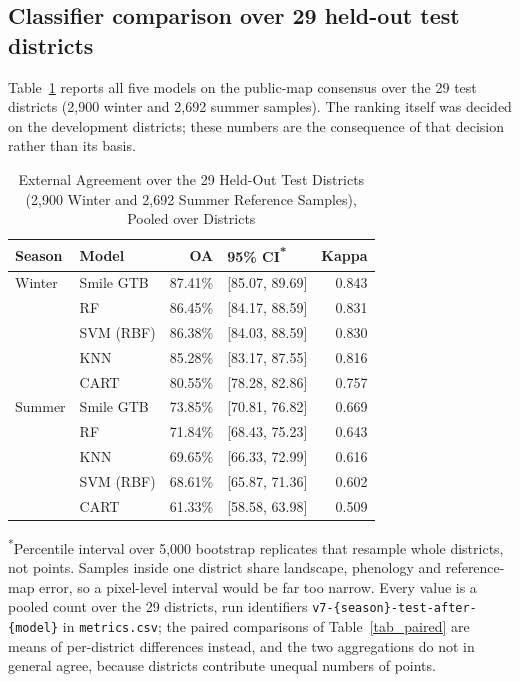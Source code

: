 \documentclass[conference]{IEEEtran}
\begin{document}
\subsection{Classifier comparison over 29 held-out test districts}
\label{sec:models}
Table~\ref{tab:statewide_accuracy} reports all five models on the public-map consensus over the 29 test districts (2,900 winter and 2,692 summer samples). The ranking itself was decided on the development districts; these numbers are the consequence of that decision rather than its basis.

\begin{table}[!htbp]
\caption{External Agreement over the 29 Held-Out Test Districts (2,900 Winter and 2,692 Summer Reference Samples), Pooled over Districts}
\label{tab:statewide_accuracy}
\centering
\setlength{\tabcolsep}{3.5pt}
\begin{tabular}{llrlr}
\toprule
\textbf{Season} & \textbf{Model} & \textbf{OA} & \textbf{95\% CI\textsuperscript{*}} & \textbf{Kappa} \\
\midrule
Winter & Smile GTB & 87.41\% & [85.07, 89.69] & 0.843 \\
       & RF        & 86.45\% & [84.17, 88.59] & 0.831 \\
       & SVM (RBF) & 86.38\% & [84.03, 88.59] & 0.830 \\
       & KNN       & 85.28\% & [83.17, 87.55] & 0.816 \\
       & CART      & 80.55\% & [78.28, 82.86] & 0.757 \\
\midrule
Summer & Smile GTB & 73.85\% & [70.81, 76.82] & 0.669 \\
       & RF        & 71.84\% & [68.43, 75.23] & 0.643 \\
       & KNN       & 69.65\% & [66.33, 72.99] & 0.616 \\
       & SVM (RBF) & 68.61\% & [65.87, 71.36] & 0.602 \\
       & CART      & 61.33\% & [58.58, 63.98] & 0.509 \\
\bottomrule
\end{tabular}

\vspace{2pt}
\parbox{\columnwidth}{\textsuperscript{*}\footnotesize Percentile interval over 5,000 bootstrap replicates that resample whole districts, not points. Samples inside one district share landscape, phenology and reference-map error, so a pixel-level interval would be far too narrow. Every value is a pooled count over the 29 districts, run identifiers \texttt{v7-\{season\}-test-after-\{model\}} in \texttt{metrics.csv}; the paired comparisons of Table~\ref{tab_paired} are means of per-district differences instead, and the two aggregations do not in general agree, because districts contribute unequal numbers of points.}
\end{table}
\end{document}
